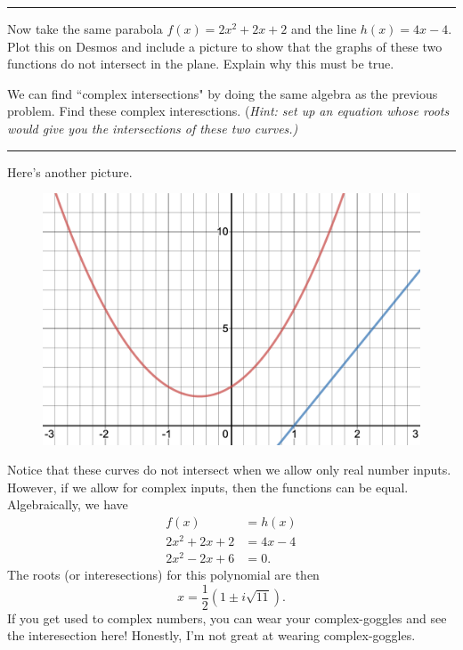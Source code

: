 \documentclass[12pt]{article} %
\begin{document}
\hrule

\begin{problem}
    Now take the same parabola $f(x)=2x^2+2x+2$ and the line $h(x)=4x-4$. Plot this on Desmos and include a picture to show that the graphs of these two functions do not intersect in the plane. Explain why this must be true.
    
    We can find ``complex intersections" by doing the same algebra as the previous problem. Find these complex interesctions. (\emph{Hint: set up an equation whose roots would give you the intersections of these two curves.)}
\end{problem}

\hrule

\begin{solution}
Here's another picture.
\begin{figure}[H]
    \centering
    \includegraphics[width=.8\textwidth]{desmos-graph(2).png}
\end{figure}
Notice that these curves do not intersect when we allow only real number inputs. However, if we allow for complex inputs, then the functions can be equal. Algebraically, we have
\begin{align*}
    f(x)&=h(x)\\
    2x^2+2x+2&= 4x-4\\
    2x^2-2x+6&=0.
\end{align*}
The roots (or interesections) for this polynomial are then
\[
x=\frac{1}{2}\left( 1 \pm i \sqrt{11}\right).
\]
If you get used to complex numbers, you can wear your complex-goggles and see the interesection here! Honestly, I'm not great at wearing complex-goggles.
\end{solution}
\end{document}
